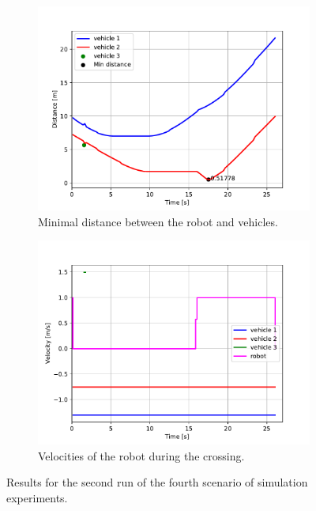            \begin{figure}[H]
                \centering
                \begin{subfigure}{0.49\linewidth}
                    \centering
                    \includegraphics[trim={13 8 40 41}, clip, width=\linewidth]{images/simulations/scene4_2_dist.pdf}
                    \caption{Minimal distance between the robot and vehicles.}
                \end{subfigure}
                \begin{subfigure}{0.49\linewidth}
                    \centering
                    \includegraphics[trim={13 8 40 41}, clip, width=\linewidth]{images/simulations/scene4_2_vel.pdf}
                    \caption{Velocities of the robot during the crossing.}
                \end{subfigure}
                \caption{Results for the second run of the fourth scenario of simulation experiments.}
                \label{fig:scene4_2_graphs}
            \end{figure}
